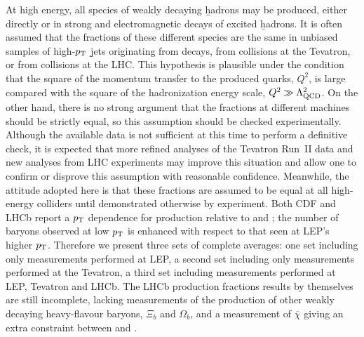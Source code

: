 
At high energy, all species of weakly decaying \b hadrons 
may be produced, either directly or in strong and electromagnetic 
decays of excited \b hadrons. It is often assumed that the fractions 
of these different species are the same in unbiased samples of 
high-$p_{\rm T}$ \b jets originating from  decays, 
from  collisions at the Tevatron, or from 
 collisions at the LHC.
This hypothesis is plausible under the condition that the square of
the momentum transfer to the produced \b quarks, $Q^2$, is large compared 
with the square of the hadronization energy scale, 
$Q^2 \gg \Lambda_{\rm QCD}^2$.
On the other hand, there is no strong argument that the
fractions at different machines should be strictly equal, so 
this assumption should be checked experimentally. Although the 
available data is not sufficient at this time to perform a definitive
check, it is expected that more refined analyses of the Tevatron Run~II data 
and new analyses from LHC 
experiments may improve this situation and allow one to confirm or 
disprove this assumption with reasonable confidence. Meanwhile, the 
attitude adopted here is that these fractions are assumed to be equal 
at all high-energy colliders until demonstrated otherwise by 
experiment.
Both CDF and LHCb report a $p_{\rm T}$ dependence for \Lb
production relative to \Bu and \Bd; the number of \Lb baryons
observed at low $p_{\rm T}$ is enhanced with respect to that 
seen at LEP's higher $p_{\rm T}$.
Therefore we present 
three sets of complete averages: one set including only measurements 
performed at LEP, a second set including only measurements performed 
at the Tevatron, a third  set including measurements performed at LEP, 
Tevatron and LHCb.  The LHCb production fractions results by themselves 
are still incomplete, lacking measurements of the production of other
weakly decaying heavy-flavour baryons, $\Xi_b$ and $\Omega_b$, and a measurement of 
$\overline{\chi}$ giving an extra constraint between \fBd and \fBs.

